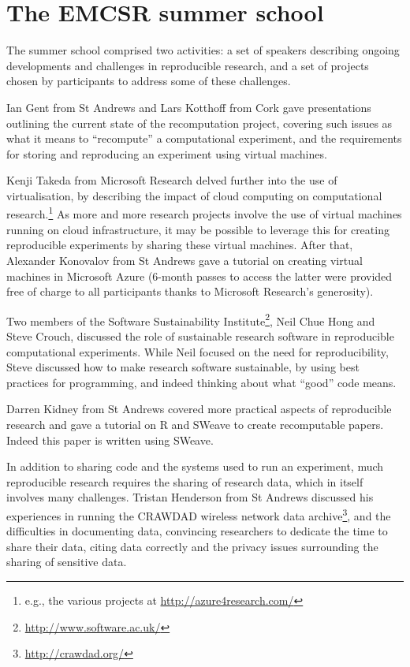 \section{The EMCSR summer school}
\label{s:school}

The summer school comprised two activities: a set of speakers
describing ongoing developments and challenges in reproducible
research, and a set of projects chosen by participants to address some
of these challenges.

Ian Gent from St Andrews and Lars Kotthoff from Cork gave
presentations outlining the current state of the recomputation
project, covering such issues as what it means to ``recompute'' a
computational experiment, and the requirements for storing and
reproducing an experiment using virtual machines.

Kenji Takeda from Microsoft Research delved further into the use of
virtualisation, by describing the impact of cloud computing on
computational research.\footnote{e.g., the various projects at
\url{http://azure4research.com/}} As more and more research projects
involve the use of virtual machines running on cloud infrastructure,
it may be possible to leverage this for creating
reproducible experiments by sharing these virtual machines. After that,
Alexander Konovalov from St Andrews gave a tutorial on creating
virtual machines in Microsoft Azure (6-month passes to access the
latter were provided free of charge to all participants thanks to Microsoft Research's
generosity).

Two members of the Software Sustainability
Institute\footnote{\url{http://www.software.ac.uk/}}, Neil Chue Hong
and Steve Crouch, discussed the role of sustainable research software
in reproducible computational experiments. While Neil focused on the
need for reproducibility, Steve discussed how to make research
software sustainable, by using best practices for programming, and
indeed thinking about what ``good'' code means.

Darren Kidney from St Andrews covered more practical aspects of reproducible
research and gave a tutorial on R and SWeave to create
recomputable papers. Indeed this paper is written using SWeave.

In addition to sharing code and the systems used to run an experiment,
much reproducible research requires the sharing of research data,
which in itself involves many challenges. Tristan Henderson from St
Andrews discussed his experiences in running the CRAWDAD wireless
network data archive\footnote{\url{http://crawdad.org/}}, and the
difficulties in documenting data, convincing researchers to dedicate
the time to share their data, citing data correctly and the privacy
issues surrounding the sharing of sensitive data.


